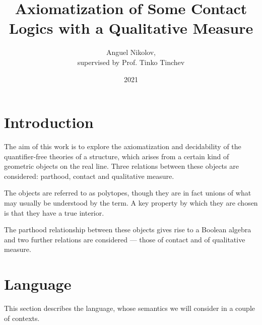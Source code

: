 \documentclass{article}
\title{Axiomatization of Some Contact Logics with a Qualitative Measure}
\author{Anguel Nikolov,\\{\small supervised by Prof. Tinko Tinchev}}
\date{2021}
\begin{document}
\maketitle

\tableofcontents

\section{Introduction}

The aim of this work is to explore the axiomatization and decidability of the quantifier-free theories of a structure, which arises from a certain kind of geometric objects on the real line. Three relations between these objects are considered: parthood, contact and qualitative measure.

The objects are referred to as polytopes, though they are in fact unions of what may usually be understood by the term. A key property by which they are chosen is that they have a true interior.

The parthood relationship between these objects gives rise to a Boolean algebra and two further relations are considered --- those of contact and of qualitative measure.

\section{Language}
This section describes the language, whose semantics we will consider in a couple of contexts.
\end{document}
